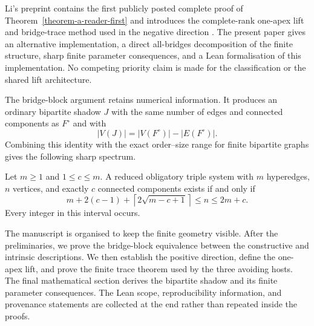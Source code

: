 Li's preprint contains the first publicly posted complete proof of
Theorem~\ref{theorem-a-reader-first} and introduces the complete-rank one-apex
lift and bridge-trace method used in the negative direction
\citep[Theorem~1.1, Sections~3--4]{li2026}.  The present paper gives an
alternative implementation, a direct all-bridges decomposition of the finite
structure, sharp finite parameter consequences, and a Lean formalisation of
this implementation.  No competing priority claim is made for the
classification or the shared lift architecture.

The bridge-block argument retains numerical information.  It produces an
ordinary bipartite shadow $J$ with the same number of edges and connected
components as $F^\circ$ and with
\[
  |V(J)|=|V(F^\circ)|-|E(F^\circ)|.
\]
Combining this identity with the exact order--size range for finite bipartite
graphs gives the following sharp spectrum.

\begin{theorem}\label{theorem-spectrum-reader-first}
Let $m\ge1$ and $1\le c\le m$.  A reduced obligatory triple system with
$m$ hyperedges, $n$ vertices, and exactly $c$ connected components exists if
and only if
\[
  m+2(c-1)+\left\lceil2\sqrt{m-c+1}\right\rceil
  \le n\le 2m+c.
\]
Every integer in this interval occurs.
\end{theorem}

The manuscript is organised to keep the finite geometry visible.  After the
preliminaries, we prove the bridge-block equivalence between the constructive
and intrinsic descriptions.  We then establish the positive direction, define
the one-apex lift, and prove the finite trace theorem used by the three avoiding
hosts.  The final mathematical section derives the bipartite shadow and its
finite parameter consequences.  The Lean scope, reproducibility information,
and provenance statements are collected at the end rather than repeated inside
the proofs.
